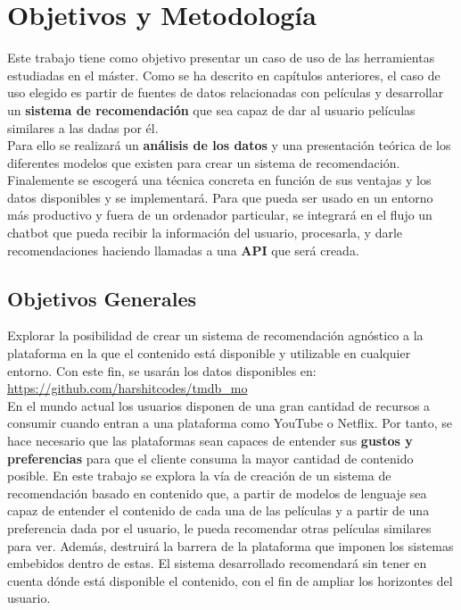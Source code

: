 \chapter{Objetivos y Metodología}\label{chap:objetivos}

Este trabajo tiene como objetivo presentar un caso de uso de las herramientas estudiadas en el máster. Como se ha descrito en capítulos anteriores, el caso de uso elegido es partir de fuentes de datos relacionadas con películas y desarrollar un \textbf{sistema de recomendación} que sea capaz de dar al usuario películas similares a las dadas por él.\\

Para ello se realizará un \textbf{análisis de los datos} y una presentación teórica de los diferentes modelos que existen para crear un sistema de recomendación. Finalemente se escogerá una técnica concreta en función de sus ventajas y los datos disponibles y se implementará. Para que pueda ser usado en un entorno más productivo y fuera de un ordenador particular, se integrará en el flujo un chatbot que pueda recibir la información del usuario, procesarla, y darle recomendaciones haciendo llamadas a una \textbf{API} que será creada.



\section{Objetivos Generales}\label{sec:objgenerales}

Explorar la posibilidad de crear un sistema de recomendación agnóstico a la plataforma en la que el contenido está disponible y utilizable en cualquier entorno. Con este fin, se usarán los datos disponibles en: \url{https://github.com/harshitcodes/tmdb_mo}\\

En el mundo actual los usuarios disponen de una gran cantidad de recursos a consumir cuando entran a una plataforma como YouTube o Netflix. Por tanto, se hace necesario que las plataformas sean capaces de entender sus \textbf{gustos y preferencias} para que el cliente consuma la mayor cantidad de contenido posible. En este trabajo se explora la vía de creación de un sistema de recomendación basado en contenido que, a partir de modelos de lenguaje sea capaz de entender el contenido de cada una de las películas y a partir de una preferencia dada por el usuario, le pueda recomendar otras películas similares para ver. Además, destruirá la barrera de la plataforma que imponen los sistemas embebidos dentro de estas. El sistema desarrollado recomendará sin tener en cuenta dónde está disponible el contenido, con el fin de ampliar los horizontes del usuario.\\

